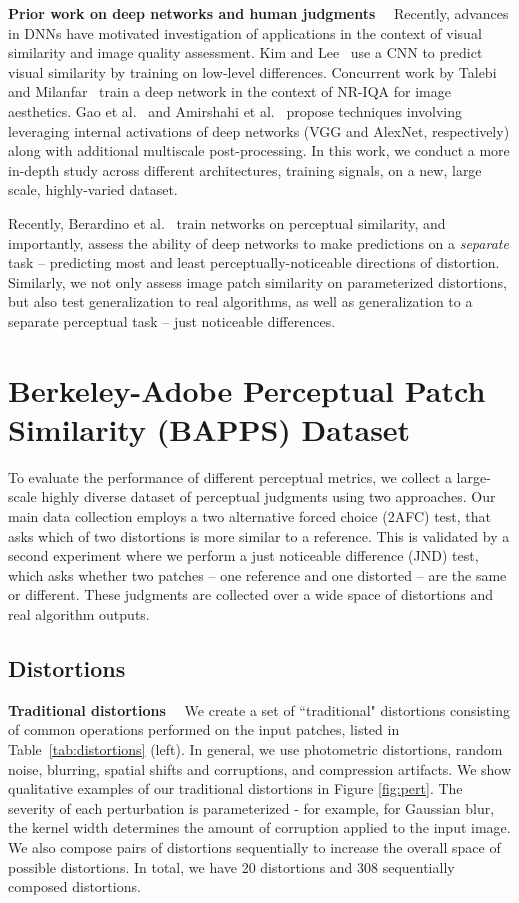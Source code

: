   \textbf{Prior work on deep networks and human judgments} \ \  Recently, advances in DNNs have motivated investigation of applications in the context of visual similarity and image quality assessment. Kim and Lee~\cite{kim2017deep} use a CNN to predict visual similarity by training on low-level differences. Concurrent work by Talebi and Milanfar~\cite{talebi2017learned,talebi2018nima} train a deep network in the context of NR-IQA for image aesthetics. Gao et al.~\cite{gao2017deepsim} and Amirshahi et al.~\cite{ali2017image} propose techniques involving leveraging internal activations of deep networks (VGG and AlexNet, respectively) along with additional multiscale post-processing. In this work, we conduct a more in-depth study across different architectures, training signals, on a new, large scale, highly-varied dataset.

Recently, Berardino et al.~\cite{berardino2017eigen} train networks on perceptual similarity, and importantly, assess the ability of deep networks to make predictions on a \textit{separate} task -- predicting most and least perceptually-noticeable directions of distortion. Similarly, we not only assess image patch similarity on parameterized distortions, but also test generalization to real algorithms, as well as generalization to a separate perceptual task -- just noticeable differences.

\section{Berkeley-Adobe Perceptual Patch Similarity (BAPPS) Dataset}
\label{sec:methods}

To evaluate the performance of different perceptual metrics, we collect a large-scale highly diverse dataset of perceptual judgments using two approaches. Our main data collection employs a two alternative forced choice (2AFC) test, that asks which of two distortions is more similar to a reference. This is validated by a second experiment where we perform a just noticeable difference (JND) test, which asks whether two patches -- one reference and one distorted -- are the same or different. These judgments are collected over a wide space of distortions and real algorithm outputs.

\subsection{Distortions}

  \textbf{Traditional distortions} \ \  We create a set of ``traditional" distortions consisting of common operations performed on the input patches, listed in Table~\ref{tab:distortions} (left). In general, we use photometric distortions, random noise, blurring, spatial shifts and corruptions, and compression artifacts. We show qualitative examples of our traditional distortions in Figure \ref{fig:pert}. The severity of each perturbation is parameterized - for example, for Gaussian blur, the kernel width determines the amount of corruption applied to the input image. We also compose pairs of distortions sequentially to increase the overall space of possible distortions. In total, we have 20 distortions and 308 sequentially composed distortions.

